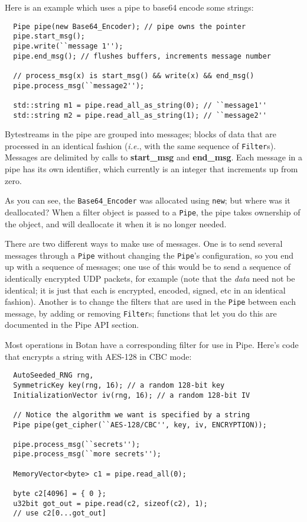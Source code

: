 \documentclass{article}
\newcommand{\function}[1]{\textbf{#1}}
\newcommand{\keyword}[1]{\texttt{#1}}
\newcommand{\type}[1]{\texttt{#1}}
\newcommand{\ie}[0]{\emph{i.e.}}
\begin{document}
Here is an example which uses a pipe to base64 encode some strings:

\begin{verbatim}
  Pipe pipe(new Base64_Encoder); // pipe owns the pointer
  pipe.start_msg();
  pipe.write(``message 1'');
  pipe.end_msg(); // flushes buffers, increments message number

  // process_msg(x) is start_msg() && write(x) && end_msg()
  pipe.process_msg(``message2'');

  std::string m1 = pipe.read_all_as_string(0); // ``message1''
  std::string m2 = pipe.read_all_as_string(1); // ``message2''
\end{verbatim}

Bytestreams in the pipe are grouped into messages; blocks of data that
are processed in an identical fashion (\ie, with the same sequence of
\type{Filter}s). Messages are delimited by calls to
\function{start\_msg} and \function{end\_msg}. Each message in a pipe
has its own identifier, which currently is an integer that increments
up from zero.

As you can see, the \type{Base64\_Encoder} was allocated using
\keyword{new}; but where was it deallocated? When a filter object is
passed to a \type{Pipe}, the pipe takes ownership of the object, and
will deallocate it when it is no longer needed.

There are two different ways to make use of messages. One is to send
several messages through a \type{Pipe} without changing the
\type{Pipe}'s configuration, so you end up with a sequence of
messages; one use of this would be to send a sequence of identically
encrypted UDP packets, for example (note that the \emph{data} need not
be identical; it is just that each is encrypted, encoded, signed, etc
in an identical fashion). Another is to change the filters that are
used in the \type{Pipe} between each message, by adding or removing
\type{Filter}s; functions that let you do this are documented in the
Pipe API section.

Most operations in Botan have a corresponding filter for use in Pipe.
Here's code that encrypts a string with AES-128 in CBC mode:

\begin{verbatim}
  AutoSeeded_RNG rng,
  SymmetricKey key(rng, 16); // a random 128-bit key
  InitializationVector iv(rng, 16); // a random 128-bit IV

  // Notice the algorithm we want is specified by a string
  Pipe pipe(get_cipher(``AES-128/CBC'', key, iv, ENCRYPTION));

  pipe.process_msg(``secrets'');
  pipe.process_msg(``more secrets'');

  MemoryVector<byte> c1 = pipe.read_all(0);

  byte c2[4096] = { 0 };
  u32bit got_out = pipe.read(c2, sizeof(c2), 1);
  // use c2[0...got_out]
\end{verbatim}
\end{document}
